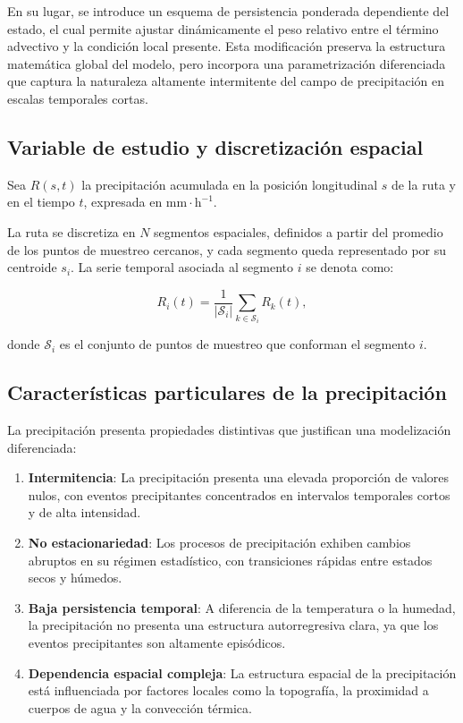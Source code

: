 \documentclass[
  spanish,
  us-letterpaper,
]{scrreprt}
\numberwithin{equation}{section}
\begin{document}
En su lugar, se introduce un esquema de persistencia ponderada
dependiente del estado, el cual permite ajustar dinámicamente el peso
relativo entre el término advectivo y la condición local presente. Esta
modificación preserva la estructura matemática global del modelo, pero
incorpora una parametrización diferenciada que captura la naturaleza
altamente intermitente del campo de precipitación en escalas temporales
cortas.

\subsection{Variable de estudio y discretización
espacial}\label{variable-de-estudio-y-discretizaciuxf3n-espacial-2}

Sea \(R(s,t)\) la precipitación acumulada en la posición longitudinal
\(s\) de la ruta y en el tiempo \(t\), expresada en
\(\mathrm{mm \cdot h^{-1}}\).

La ruta se discretiza en \(N\) segmentos espaciales, definidos a partir
del promedio de los puntos de muestreo cercanos, y cada segmento queda
representado por su centroide \(s_i\). La serie temporal asociada al
segmento \(i\) se denota como:

\[
R_i(t) = \frac{1}{|\mathcal{S}_i|} \sum_{k \in \mathcal{S}_i} R_k(t),
\]

donde \(\mathcal{S}_i\) es el conjunto de puntos de muestreo que
conforman el segmento \(i\).

\subsection{Características particulares de la
precipitación}\label{caracteruxedsticas-particulares-de-la-precipitaciuxf3n}

La precipitación presenta propiedades distintivas que justifican una
modelización diferenciada:

\begin{enumerate}
\def\labelenumi{\arabic{enumi}.}
\item
  \textbf{Intermitencia}: La precipitación presenta una elevada
  proporción de valores nulos, con eventos precipitantes concentrados en
  intervalos temporales cortos y de alta intensidad.
\item
  \textbf{No estacionariedad}: Los procesos de precipitación exhiben
  cambios abruptos en su régimen estadístico, con transiciones rápidas
  entre estados secos y húmedos.
\item
  \textbf{Baja persistencia temporal}: A diferencia de la temperatura o
  la humedad, la precipitación no presenta una estructura autorregresiva
  clara, ya que los eventos precipitantes son altamente episódicos.
\item
  \textbf{Dependencia espacial compleja}: La estructura espacial de la
  precipitación está influenciada por factores locales como la
  topografía, la proximidad a cuerpos de agua y la convección térmica.
\end{enumerate}
\end{document}
